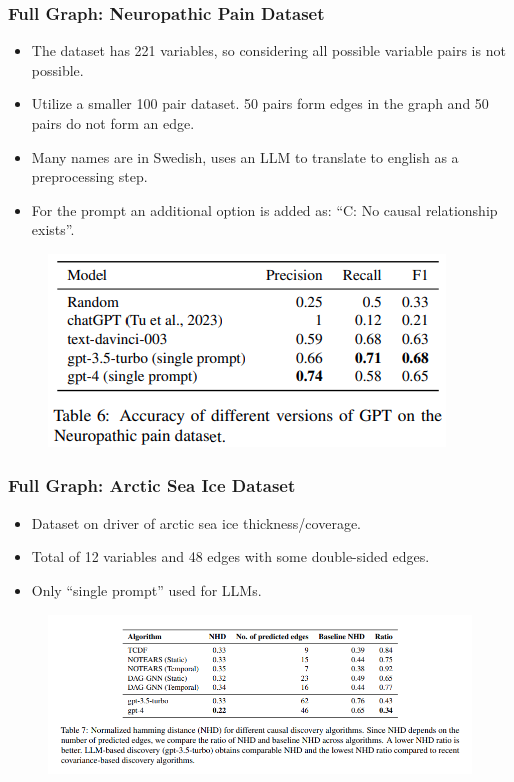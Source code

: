 \documentclass{beamer}
\begin{document}
\begin{frame}
	\frametitle{Full Graph: Neuropathic Pain Dataset}
	\begin{itemize}
		\item The dataset has 221 variables, so considering all possible variable pairs is not possible.
		\item Utilize a smaller 100 pair dataset. 50 pairs form edges in the graph and 50 pairs do not form an edge.
		\item Many names are in Swedish, uses an LLM to translate to english as a preprocessing step.
		\item For the prompt an additional option is added as: ``C: No causal relationship exists''.
	\end{itemize}
	\begin{figure}
		\includegraphics[scale=0.4]{imgs/table6.png}
	\end{figure}
\end{frame}

\begin{frame}
	\frametitle{Full Graph: Arctic Sea Ice Dataset}
	\begin{itemize}
		\item Dataset on driver of arctic sea ice thickness/coverage.
		\item Total of 12 variables and 48 edges with some double-sided edges.
		\item Only ``single prompt'' used for LLMs.
	\end{itemize}
	\begin{figure}
		\includegraphics[scale=0.4]{imgs/table7.png}
	\end{figure}
\end{frame}
\end{document}
